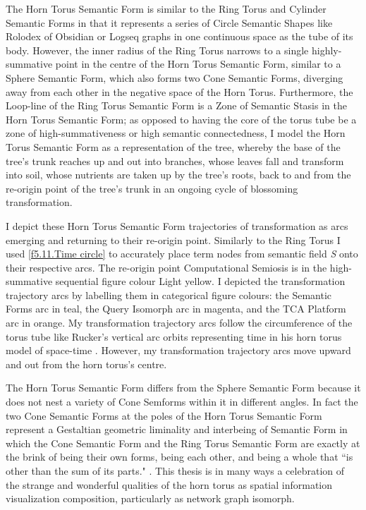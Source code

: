 The Horn Torus Semantic Form is similar to the Ring Torus and Cylinder Semantic Forms in that it represents a series of Circle Semantic Shapes like Rolodex \citep{mellby_my_2021} of Obsidian or Logseq graphs in one continuous space as the tube of its body. However, the inner radius of the Ring Torus narrows to a single highly-summative point in the centre of the Horn Torus Semantic Form, similar to a Sphere Semantic Form, which also forms two Cone Semantic Forms, diverging away from each other in the negative space of the Horn Torus. Furthermore, the Loop-line of the Ring Torus Semantic Form is a Zone of Semantic Stasis in the Horn Torus Semantic Form; as opposed to having the core of the torus tube be a zone of high-summativeness or high semantic connectedness, I model the Horn Torus Semantic Form as a representation of the tree, whereby the base of the tree's trunk reaches up and out into branches, whose leaves fall and transform into soil, whose nutrients are taken up by the tree's roots, back to and from the re-origin point of the tree's trunk in an ongoing cycle of blossoming transformation.

I depict these Horn Torus Semantic Form trajectories of transformation as arcs emerging and returning to their re-origin point. Similarly to the Ring Torus I used \autoref{f5.11.Time circle} to accurately place term nodes from semantic field \textit{S} onto their respective arcs. The re-origin point Computational Semiosis is in the high-summative sequential figure colour Light yellow. I depicted the transformation trajectory arcs by labelling them in categorical figure colours: the Semantic Forms arc in teal, the Query Isomorph arc in magenta, and the TCA Platform arc in orange. My transformation trajectory arcs follow the circumference of the torus tube like Rucker's vertical arc orbits representing time in his horn torus model of space-time \citep{rucker_infinity_2005}. However, my transformation trajectory arcs move upward and out from the horn torus's centre. 

The Horn Torus Semantic Form differs from the Sphere Semantic Form because it does not nest a variety of Cone Semforms within it in different angles. In fact the two Cone Semantic Forms at the poles of the Horn Torus Semantic Form represent a Gestaltian geometric liminality and interbeing \citep[p. 80]{nhat_hanh_world_2008}  \citep[p.25]{deleuze_thousand_2007} of Semantic Form in which the Cone Semantic Form and the Ring Torus Semantic Form are exactly at the brink of being their own forms, being each other, and being a whole that ``is other than the sum of its parts."  \citep[Koffka in Sevaldson, p. 163]{sevaldson_designing_2022}. This thesis is in many ways a celebration of the strange and wonderful qualities of the horn torus as spatial information visualization composition, particularly as network graph isomorph.

